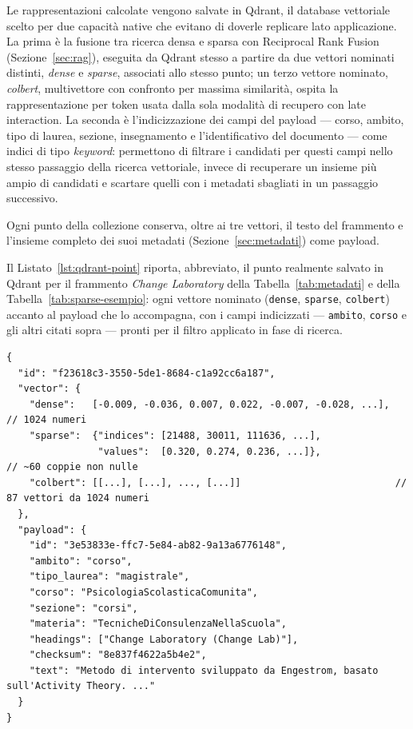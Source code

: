 Le rappresentazioni calcolate vengono salvate in Qdrant, il database vettoriale scelto per due capacità native che
evitano di doverle replicare lato applicazione. La prima è la fusione tra ricerca densa e sparsa con Reciprocal Rank
Fusion (Sezione~\ref{sec:rag}), eseguita da Qdrant stesso a partire da due vettori nominati distinti, \emph{dense} e
\emph{sparse}, associati allo stesso punto; un terzo vettore nominato, \emph{colbert}, multivettore con
confronto per massima similarità, ospita la rappresentazione per token usata dalla sola modalità di recupero con
late interaction. La seconda è l'indicizzazione dei campi del
payload --- corso, ambito, tipo di laurea, sezione, insegnamento e l'identificativo del documento --- come
indici di tipo \emph{keyword}: permettono di filtrare i candidati per questi campi nello stesso passaggio della
ricerca vettoriale, invece di recuperare un insieme più ampio di candidati e scartare quelli con i metadati sbagliati
in un passaggio successivo.

Ogni punto della collezione conserva, oltre ai tre vettori, il testo del frammento e l'insieme completo dei suoi
metadati (Sezione~\ref{sec:metadati}) come payload.

Il Listato~\ref{lst:qdrant-point} riporta, abbreviato, il punto realmente salvato in Qdrant per il frammento
\emph{Change Laboratory} della Tabella~\ref{tab:metadati} e della Tabella~\ref{tab:sparse-esempio}: ogni vettore
nominato (\texttt{dense}, \texttt{sparse}, \texttt{colbert}) accanto al payload che lo accompagna, con i campi
indicizzati --- \texttt{ambito}, \texttt{corso} e gli altri citati sopra --- pronti per il filtro
applicato in fase di ricerca.

\begin{lstlisting}[caption={Punto Qdrant del frammento \emph{Change Laboratory} (identificativo abbreviato nei
valori numerici, per brevità).}, label={lst:qdrant-point}]
{
  "id": "f23618c3-3550-5de1-8684-c1a92cc6a187",
  "vector": {
    "dense":   [-0.009, -0.036, 0.007, 0.022, -0.007, -0.028, ...],  // 1024 numeri
    "sparse":  {"indices": [21488, 30011, 111636, ...],
                "values":  [0.320, 0.274, 0.236, ...]},              // ~60 coppie non nulle
    "colbert": [[...], [...], ..., [...]]                           // 87 vettori da 1024 numeri
  },
  "payload": {
    "id": "3e53833e-ffc7-5e84-ab82-9a13a6776148",
    "ambito": "corso",
    "tipo_laurea": "magistrale",
    "corso": "PsicologiaScolasticaComunita",
    "sezione": "corsi",
    "materia": "TecnicheDiConsulenzaNellaScuola",
    "headings": ["Change Laboratory (Change Lab)"],
    "checksum": "8e837f4622a5b4e2",
    "text": "Metodo di intervento sviluppato da Engestrom, basato sull'Activity Theory. ..."
  }
}
\end{lstlisting}

